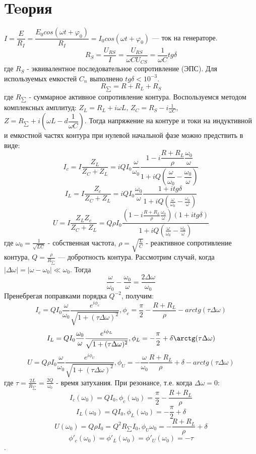 \documentclass[a4paper, 12pt]{article}%
\begin{document}
\section*{Teория}
$I=\dfrac{E}{R_I}=\dfrac{E_0cos(\omega t+\varphi_0)}{R_I}=I_0cos(\omega t+\varphi_0)$ --- ток на генераторе.\newline
$$R_S=\dfrac{U_{RS}}{I}=\frac{U_{RS}}{\omega CU_{CS}}=\dfrac{1}{\omega C}tg\delta$$
где $R_S$ - эквивалентное последовательное сопротивление (ЭПС).\newline
Для используемых емкостей $C_n$ выполнено $tg\delta<10^{-3}$.\newline
$$R_{\sum}=R+R_L+R_S$$
где $R_{\sum}$ - суммарное активное сопротивление контура.\newline
Воспользуемся методом комплексных амплитуд:\newline
$Z_L=R_L+i\omega L$, $Z_C=R_S-i\frac{1}{\omega C}$, $Z=R_{\sum}+i(\omega L-d\dfrac{1}{\omega C})$.\newline
Тогда напряжение на контуре и токи на индуктивной и емкостной частях контура при нулевой начальной фазе можно предствить в виде:\newline
$$I_c=I\dfrac{Z_L}{Z_C+Z_L}=iQI_0\dfrac{\omega}{\omega_0}\dfrac{1-i\dfrac{R+R_L}{\rho}\dfrac{\omega_0}{\omega}}{1+iQ(\dfrac{\omega}{\omega_0}-\dfrac{\omega_0}{\omega})}$$
$$I_L=I\dfrac{Z_c}{Z_C+Z_L}=iQI_0\frac{\omega_0}{\omega}\frac{1+itg\delta}{1+iQ(\frac{\omega}{\omega_0}-\frac{\omega_0}{\omega})}$$
$$U=I\frac{Z_LZ_c}{Z_C+Z_L}=Q\rho I_0\frac{(1-i\frac{R+R_L}{\rho}\frac{\omega_0}{\omega})(1+itg\delta)}{1+iQ(\frac{\omega}{\omega_0}-\frac{\omega_0}{\omega})}$$
где $\omega_0=\frac{1}{\sqrt{LC}}$ - собственная частота, $\rho=\sqrt{\frac{L}{C}}$ - реактивное сопротивление контура, $Q=\frac{\rho} {R_{\sum}}$ --- добротность контура.\newline
Рассмотрим случай, когда $|\Delta\omega|=|\omega-\omega_0|\ll\omega_0$. Тогда
$$\frac{\omega}{\omega_0}-\frac{\omega_0}{\omega}=\frac{2\Delta\omega}{\omega_0}$$
Пренебрегая поправками порядка $Q^{-2}$, получим:
$$I_c=QI_0\frac{\omega}{\omega_0}\frac{e^{i\phi_c}}{\sqrt{1+(\tau\Delta\omega)^2}},    \phi_c=\frac{\pi}{2}-\frac{R+R_L}{\rho}-arctg(\tau\Delta\omega)$$
$$I_L=QI_0\frac{\omega_0}{\omega}\frac{e^{i\phi_L}}{\sqrt{1+(\tau\Delta\omega)^2}}, \phi_L=-\frac{\pi}{2}+\delta\arctg(\tau\Delta\omega)$$
$$U=Q\rho I_0\frac{\omega}{\omega_0}\frac{e^{i\phi_U}}{\sqrt{1+(\tau\Delta\omega)^2}}, \phi_U=-\frac{\omega}{\omega_0}\frac{R+R_L}{\rho}+\delta-arctg(\tau\Delta\omega)$$
где $\tau=\frac{2L}{R_{\sum}}=\frac{2Q}{\omega_0}$ - время затухания.\newline
При резонансе, т.е. когда $\Delta\omega=0$:
$$I_c(\omega_0)=QI_0, \phi_c(\omega_0)=\frac{\pi}{2}-\frac{R+R_L}{\rho}$$
$$I_L(\omega_0)=QI_0, \phi_L(\omega_0)=-\frac{\pi}{2}+\delta$$
$$U(\omega_0)=Q\rho I_0=Q^2R_{\sum}I_0, \phi_U{\omega_0}=-\frac{R+R_L}{\rho}+\delta$$
$$\phi'_c(\omega_0)=\phi'_L(\omega_0)=\phi'_U(\omega_0)=-\tau$$.
\end{document}
